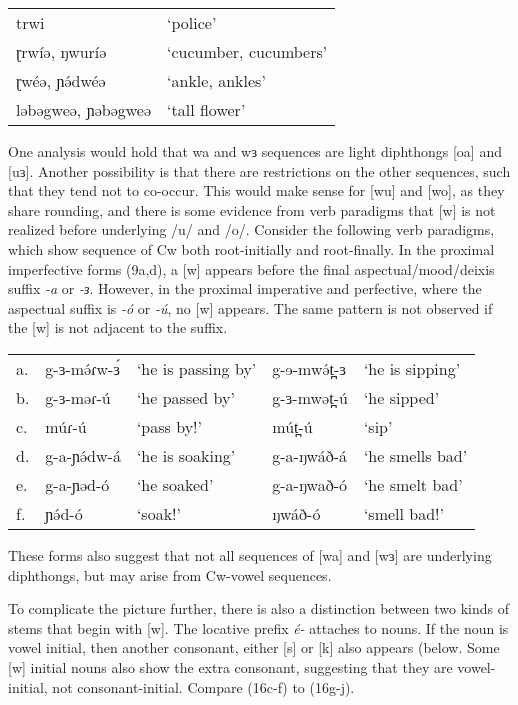 \ea	\begin{tabular}[t]{ll}
	trwi				&	‘police’\\
	ɽrwíə, ŋwuríə		&	‘cucumber, cucumbers’\\
	ɽwéə, ɲə́dwéə 		&	‘ankle, ankles’\\
	ləbəgweə, ɲəbəgweə	&	‘tall flower’
	\end{tabular}\label{ex:ch2:8}
\z 
	
One analysis would hold that wa and wɜ sequences are light diphthongs [oa] and [uɜ]. Another possibility is that there are restrictions on the other sequences, such that they tend not to co-occur. This would make sense for [wu] and [wo], as they share rounding, and there is some evidence from verb paradigms that [w] is not realized before underlying /u/ and /o/. Consider the following verb paradigms, which show sequence of Cw both root-initially and root-finally. In the proximal imperfective forms (9a,d), a [w] appears before the final aspectual/mood/deixis suffix \textit{-a} or \textit{-ɜ}. However, in the proximal imperative and perfective, where the aspectual suffix is \textit{-ó} or \textit{-ú}, no [w] appears. The same pattern is not observed if the [w] is not adjacent to the suffix.

\ea \begin{tabular}[t]{lllll}
	a.	&	g-ɜ-mə́ɾw-ɜ́	&‘he is passing by’	&g-ɘ-mwə́t̪-ɜ	&	‘he is sipping’\\
	b.	&	g-ɜ-məɾ-ú	&‘he passed by’	&g-ɜ-mwət̪-ú		&	‘he sipped’\\
	c.	&	múɾ-ú		&‘pass by!’		&mút̪-ú			&	‘sip’\\
	d.	&	g-a-ɲə́dw-á	&‘he is soaking’	&g-a-ŋwáð-á		&	‘he smells bad’\\
	e.	&	g-a-ɲəd-ó	&‘he soaked’		&g-a-ŋwað-ó		&	‘he smelt bad’\\
	f.	&	ɲə́d-ó		&‘soak!’			&ŋwáð-ó			&	‘smell bad!’
	\end{tabular}\label{ex:ch2:9}
\z 

			
These forms also suggest that not all sequences of [wa] and [wɜ] are underlying diphthongs, but may arise from Cw-vowel sequences.

To complicate the picture further, there is also a distinction between two kinds of stems that begin with [w]. The locative prefix \textit{é-} attaches to nouns. If the noun is vowel initial, then another consonant, either [s] or [k] also appears (below. Some [w] initial nouns also show the extra consonant, suggesting that they are vowel-initial, not consonant-initial. Compare (16c-f) to (16g-j). 

